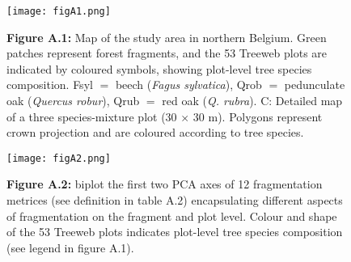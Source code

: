 \documentclass[10pt, twoside]{book} %
\begin{document}
\begin{landscape}
\begin{table}
\begin{center}
\begin{footnotesize}
\begin{tabular}{l c c c c c c c}
				

				
			\end{tabular}\endgroup
		\end{footnotesize}
	\end{center}
\end{table}
\end{landscape}
\clearpage

\begin{figure}[th]
	\begin{center}
		\texttt{[image: figA1.png]}
	\end{center}
	\caption*{\textbf{Figure A.1:} Map of the study area in northern Belgium. Green patches represent forest fragments, and the 53 Treeweb plots are indicated by coloured symbols, showing plot-level tree species composition. Fsyl $=$ beech (\textit{Fagus sylvatica}), Qrob $=$ pedunculate oak (\textit{Quercus robur}), Qrub $=$ red oak (\textit{Q. rubra}). C: Detailed map of a three species-mixture plot (30 $\times$ 30 m). Polygons represent crown projection and are coloured according to tree species.  \label{FigA1}}
\end{figure}


\begin{figure}[th]
	\begin{center}
		\texttt{[image: figA2.png]}
	\end{center}
	\caption*{\textbf{Figure A.2:} biplot the first two PCA axes of 12 fragmentation metrices (see definition in table A.2) encapsulating different aspects of fragmentation on the fragment and plot level. Colour and shape of the 53 Treeweb plots indicates plot-level tree species composition (see legend in figure A.1). \label{FigA1}}
\end{figure}
\end{document}
